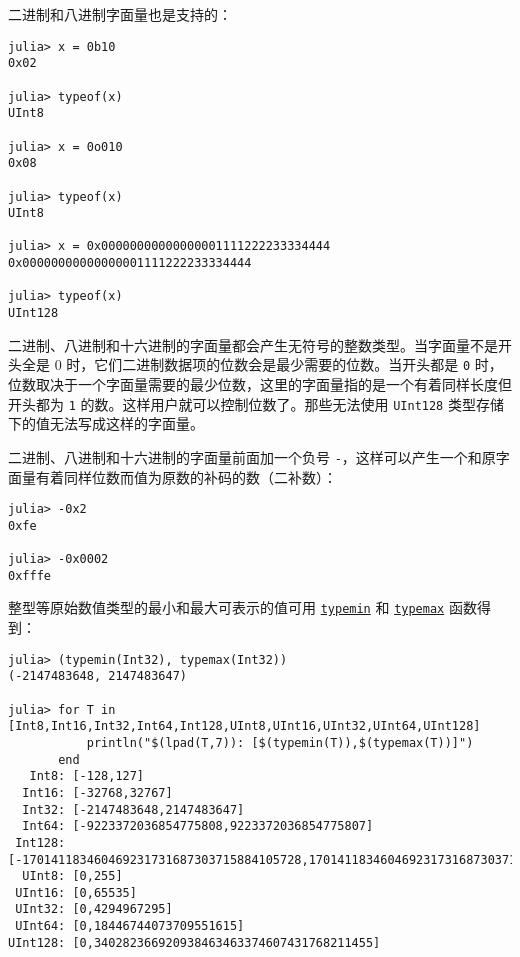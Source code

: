二进制和八进制字面量也是支持的：




\begin{verbatim}
julia> x = 0b10
0x02

julia> typeof(x)
UInt8

julia> x = 0o010
0x08

julia> typeof(x)
UInt8

julia> x = 0x00000000000000001111222233334444
0x00000000000000001111222233334444

julia> typeof(x)
UInt128
\end{verbatim}



二进制、八进制和十六进制的字面量都会产生无符号的整数类型。当字面量不是开头全是 0 时，它们二进制数据项的位数会是最少需要的位数。当开头都是 \texttt{0} 时，位数取决于一个字面量需要的最少位数，这里的字面量指的是一个有着同样长度但开头都为 \texttt{1} 的数。这样用户就可以控制位数了。那些无法使用 \texttt{UInt128} 类型存储下的值无法写成这样的字面量。



二进制、八进制和十六进制的字面量前面加一个负号 \texttt{-}，这样可以产生一个和原字面量有着同样位数而值为原数的补码的数（二补数）：




\begin{verbatim}
julia> -0x2
0xfe

julia> -0x0002
0xfffe
\end{verbatim}



整型等原始数值类型的最小和最大可表示的值可用 \hyperlink{3613894539247233488}{\texttt{typemin}} 和 \hyperlink{17760305803764597758}{\texttt{typemax}} 函数得到：




\begin{verbatim}
julia> (typemin(Int32), typemax(Int32))
(-2147483648, 2147483647)

julia> for T in [Int8,Int16,Int32,Int64,Int128,UInt8,UInt16,UInt32,UInt64,UInt128]
           println("$(lpad(T,7)): [$(typemin(T)),$(typemax(T))]")
       end
   Int8: [-128,127]
  Int16: [-32768,32767]
  Int32: [-2147483648,2147483647]
  Int64: [-9223372036854775808,9223372036854775807]
 Int128: [-170141183460469231731687303715884105728,170141183460469231731687303715884105727]
  UInt8: [0,255]
 UInt16: [0,65535]
 UInt32: [0,4294967295]
 UInt64: [0,18446744073709551615]
UInt128: [0,340282366920938463463374607431768211455]
\end{verbatim}



